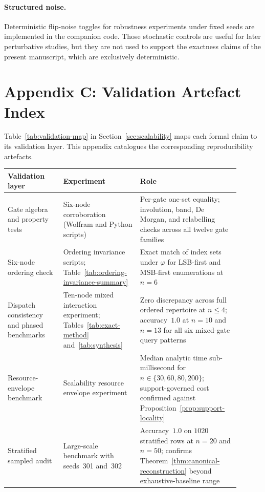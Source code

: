 \documentclass[11pt]{article}
\theoremstyle{definition}
\begin{document}
\paragraph{Structured noise.}
Deterministic flip-noise toggles for robustness experiments under fixed seeds are implemented in the companion code. Those stochastic controls are useful for later perturbative studies, but they are not used to support the exactness claims of the present manuscript, which are exclusively deterministic.

\section{Appendix C: Validation Artefact Index}
Table~\ref{tab:validation-map} in Section~\ref{sec:scalability} maps each formal claim to its validation layer. This appendix catalogues the corresponding reproducibility artefacts.

\begin{center}
\small
\begin{tabular}{p{0.22\linewidth}p{0.30\linewidth}p{0.38\linewidth}}
\toprule
\textbf{Validation layer} & \textbf{Experiment} & \textbf{Role} \\
\midrule
Gate algebra and property tests &
Six-node corroboration (Wolfram and Python scripts) &
Per-gate one-set equality; involution, band, De Morgan, and relabelling checks across all twelve gate families \\[4pt]

Six-node ordering check &
Ordering invariance scripts; Table~\ref{tab:ordering-invariance-summary} &
Exact match of index sets under \(\varphi\) for LSB-first and MSB-first enumerations at \(n=6\) \\[4pt]

Dispatch consistency and phased benchmarks &
Ten-node mixed interaction experiment; Tables~\ref{tab:exact-method} and~\ref{tab:synthesis} &
Zero discrepancy across full ordered repertoire at \(n\leq 4\); accuracy~\(1.0\) at \(n=10\) and \(n=13\) for all six mixed-gate query patterns \\[4pt]

Resource-envelope benchmark &
Scalability resource envelope experiment &
Median analytic time sub-millisecond for \(n\in\{30,60,80,200\}\); support-governed cost confirmed against Proposition~\ref{prop:support-locality} \\[4pt]

Stratified sampled audit &
Large-scale benchmark with seeds~301 and~302 &
Accuracy~\(1.0\) on \(1020\) stratified rows at \(n=20\) and \(n=50\); confirms Theorem~\ref{thm:canonical-reconstruction} beyond exhaustive-baseline range \\
\bottomrule
\end{tabular}
\end{center}
\end{document}

